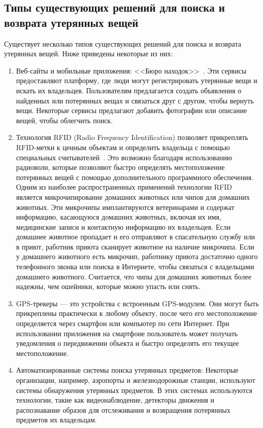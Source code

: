 \subsection{Типы существующих решений для поиска и возврата утерянных вещей}

Существует несколько типов существующих решений для поиска и возврата утерянных вещей. Ниже приведены некоторые из них:
\begin{enumerate}
	\item Веб-сайты и мобильные приложения: <<Бюро находок>>~\cite{bib:stol_nahodok,bib:pona}. Эти сервисы предоставляют платформу, где люди могут регистрировать утерянные вещи и искать их владельцев. Пользователям предлагается создать объявления о найденных или потерянных вещах и связаться друг с другом, чтобы вернуть вещи. Некоторые сервисы предлагают добавить фотографии или описание вещей, чтобы облегчить поиск. 
	
	\item Технология RFID (Radio Frequency Identification) позволяет прикреплять RFID-метки к ценным объектам и определить владельца с помощью специальных считывателей~\cite{bib:investopedia_rfid,bib:airtag}. Это возможно благодаря использованию радиоволн, которые позволяют быстро определять местоположение потерянных вещей с помощью дополнительного программного обеспечения. Одним из наиболее распространенных применений технологии RFID является микрочипирование домашних животных или чипов для домашних животных. Эти микрочипы имплантируются ветеринарами и содержат информацию, касающуюся домашних животных, включая их имя, медицинские записи и контактную информацию их владельцев. Если домашнее животное пропадает и его отправляют в спасательную службу или в приют, работник приюта сканирует животное на наличие микрочипа. Если у домашнего животного есть микрочип, работнику приюта достаточно одного телефонного звонка или поиска в Интернете, чтобы связаться с владельцами домашнего животного. Считается, что чипы для домашних животных более надежны, чем ошейники, которые можно упасть или снять.
	
	\item GPS-трекеры --- это устройства с встроенным GPS-модулем. Они могут быть прикреплены практически к любому объекту, после чего его местоположение определяется через смартфон или компьютер по сети Интернет. При использовании приложения на смартфоне пользователь может получать уведомления о передвижении объекта и быстро определять его текущее местоположение.
	
	\item Автоматизированные системы поиска утерянных предметов: Некоторые организации, например, аэропорты и железнодорожные станции, используют системы обнаружения утерянных предметов. В этих системах используются технологии, такие как видеонаблюдение, детекторы движения и распознавание образов для отслеживания и возвращения потерянных предметов их владельцам.
\end{enumerate}

